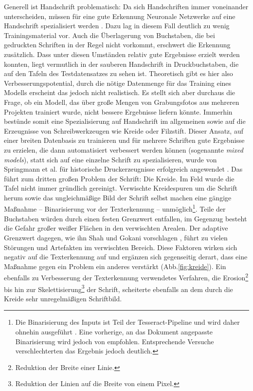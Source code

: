 Generell ist Handschrift problematisch: Da sich Handschriften immer voneinander unterscheiden, müssen für eine gute Erkennung Neuronale Netzwerke auf eine Handschrift spezialisiert werden \cite{sumedhahallale}. Dazu lag in diesem Fall deutlich zu wenig Trainingsmaterial vor. Auch die Überlagerung von Buchstaben, die bei gedruckten Schriften in der Regel nicht vorkommt, erschwert die Erkennung zusätzlich. Dass unter diesen Umständen relativ gute Ergebnisse erzielt werden konnten, liegt vermutlich in der sauberen Handschrift in Druckbuchstaben, die auf den Tafeln des Testdatensatzes zu sehen ist. Theoretisch gibt es hier also Verbesserungspotential, durch die nötige Datenmenge für das Training eines Modells erscheint das jedoch nicht realistisch. Es stellt sich aber durchaus die Frage, ob ein Modell, das über große Mengen von Grabungsfotos aus mehreren Projekten trainiert wurde, nicht bessere Ergebnisse liefern könnte. Immerhin bestünde somit eine Spezialisierung auf Handschrift im allgemeinen sowie auf die Erzeugnisse von Schreibwerkzeugen wie Kreide oder Filzstift. Dieser Ansatz, auf einer breiten Datenbasis zu trainieren und für mehrere Schriften gute Ergebnisse zu erzielen, die dann automatisiert verbessert werden können (sogenannte \textit{mixed models}), statt sich auf eine einzelne Schrift zu spezialisieren, wurde von Springmann et al. für historische Druckerzeugnisse erfolgreich angewendet \cite{springmann}.
Das führt zum dritten großen Problem der Schrift: Die Kreide. Im Feld wurde die Tafel nicht immer gründlich gereinigt. Verwischte Kreidespuren um die Schrift herum sowie das ungleichmäßige Bild der Schrift selbst machen eine gängige Maßnahme -- Binarisierung vor der Texterkennung \cite{hamad}{} \cite{sumedhahallale}{} -- unmöglich\footnote{Die Binarisierung des Inputs ist Teil der Tesseract-Pipeline und wird daher ohnehin ausgeführt \cite{forsberg}. Eine vorherige, an das Dokument angepasste Binarisierung wird jedoch von empfohlen. Entsprechende Versuche verschlechterten das Ergebnis jedoch deutlich.}. Teile der Buchstaben würden durch einen festen Grenzwert entfallen, im Gegenzug besteht die Gefahr großer weißer Flächen in den verwischten Arealen. Der adaptive Grenzwert dagegen, wie ihn Shah und Gokani vorschlagen \cite{jenilshah}, führt zu vielen Störungen und Artefakten im verwischten Bereich. Diese Faktoren wirken sich negativ auf die Texterkennung auf und ergänzen sich gegenseitig derart, dass eine Maßnahme gegen ein Problem ein anderes verstärkt (Abb.\ref{fig:kreide}).
Ein ebenfalls zu Verbesserung der Texterkennung verwendetes Verfahren, die Erosion\footnote{Reduktion der Breite einer Linie.} bis hin zur Skelettisierung\footnote{Reduktion der Linien auf die Breite von einem Pixel.} \cite{hamad}{} \cite{sumedhahallale}{} der Schrift, scheiterte ebenfalls an dem durch die Kreide sehr unregelmäßigen Schriftbild.
